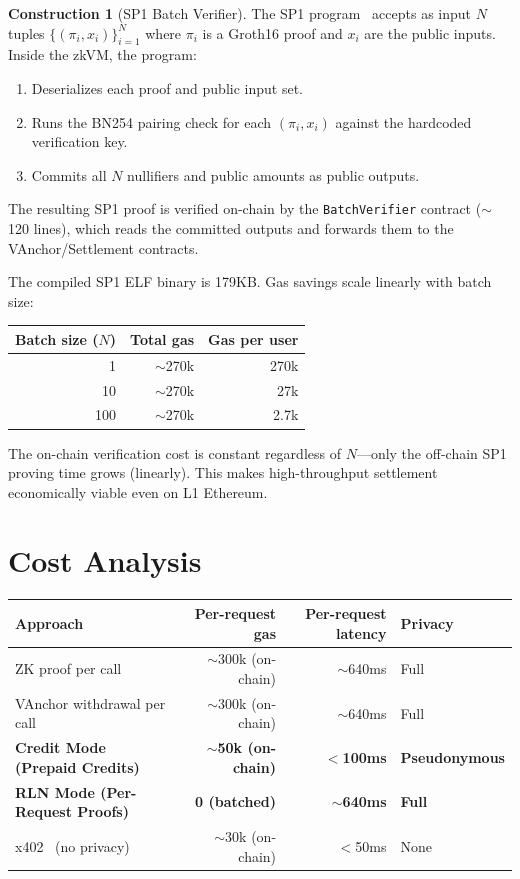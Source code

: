 \documentclass[11pt,a4paper]{article}
\theoremstyle{definition}
\newtheorem{construction}{Construction}
\begin{document}
\begin{construction}[SP1 Batch Verifier]
The SP1 program~\cite{sp1} accepts as input $N$ tuples $\{(\pi_i, x_i)\}_{i=1}^N$ where $\pi_i$ is a Groth16 proof and $x_i$ are the public inputs. Inside the zkVM, the program:
\begin{enumerate}[nosep]
  \item Deserializes each proof and public input set.
  \item Runs the BN254 pairing check for each $(\pi_i, x_i)$ against the hardcoded verification key.
  \item Commits all $N$ nullifiers and public amounts as public outputs.
\end{enumerate}
The resulting SP1 proof is verified on-chain by the \texttt{BatchVerifier} contract ($\sim$120 lines), which reads the committed outputs and forwards them to the VAnchor/Settlement contracts.
\end{construction}

The compiled SP1 ELF binary is 179KB. Gas savings scale linearly with batch size:

\begin{center}
\begin{tabular}{@{}rrr@{}}
\toprule
\textbf{Batch size ($N$)} & \textbf{Total gas} & \textbf{Gas per user} \\
\midrule
1 & $\sim$270k & 270k \\
10 & $\sim$270k & 27k \\
100 & $\sim$270k & 2.7k \\
\bottomrule
\end{tabular}
\end{center}

The on-chain verification cost is constant regardless of $N$---only the off-chain SP1 proving time grows (linearly). This makes high-throughput settlement economically viable even on L1 Ethereum.

\section{Cost Analysis}

\begin{center}
\begin{tabular}{@{}lrrl@{}}
\toprule
\textbf{Approach} & \textbf{Per-request gas} & \textbf{Per-request latency} & \textbf{Privacy} \\
\midrule
ZK proof per call~\cite{zkapi} & $\sim$300k (on-chain) & $\sim$640ms & Full \\
VAnchor withdrawal per call & $\sim$300k (on-chain) & $\sim$640ms & Full \\
\textbf{Credit Mode (Prepaid Credits)} & \textbf{$\sim$50k (on-chain)} & $<$\textbf{100ms} & \textbf{Pseudonymous} \\
\textbf{RLN Mode (Per-Request Proofs)} & \textbf{0 (batched)} & $\sim$\textbf{640ms} & \textbf{Full} \\
x402~\cite{x402} (no privacy) & $\sim$30k (on-chain) & $<$50ms & None \\
\bottomrule
\end{tabular}
\end{center}
\end{document}
